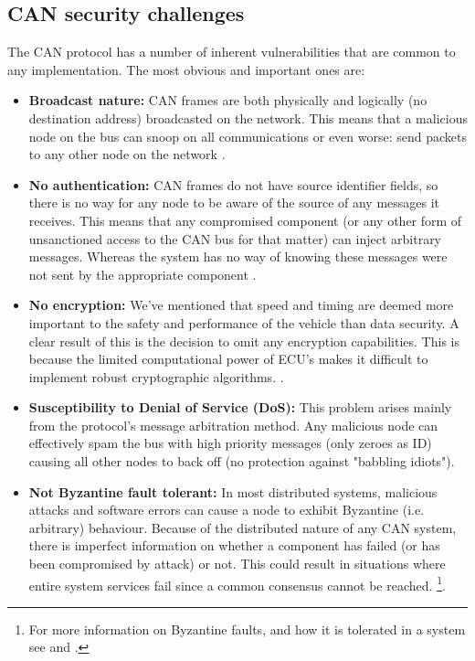 \documentclass[master=cws,masteroption=vs,english]{kulemt}
\begin{document}
\subsection{CAN security challenges}
\label{sec:can_challenges}
The CAN protocol has a number of inherent vulnerabilities that are common to any implementation. The most obvious and important ones are:

\begin{itemize}
	\item \textbf{Broadcast nature:} CAN frames are both physically and logically (no destination address) broadcasted on the network. This means that a malicious node on the bus can snoop on all communications or even worse: send packets to any other node on the network \cite{Kosher}. 
	
	\item \textbf{No authentication:} CAN frames do not have source identifier fields, so there is no way for any node to be aware of the source of any messages it receives. This means that any compromised component (or any other form of unsanctioned access to the CAN bus for that matter) can inject arbitrary messages. Whereas the system has no way of knowing these messages were not sent by the appropriate component \cite{Kosher}\cite{CANissues}.
	
	\item \textbf{No encryption:} We've mentioned that speed and timing are deemed more important to the safety and performance of the vehicle than data security. A clear result of this is the decision to omit any encryption capabilities. This is because the limited  computational power of ECU's makes it difficult to implement robust cryptographic algorithms. \cite{CANissues}.  
	
	\item \textbf{Susceptibility to Denial of Service (DoS):} This problem arises mainly from the protocol's message arbitration method. Any malicious node can effectively spam the bus with high priority messages (only zeroes as ID) causing all other nodes to back off (no protection against "babbling idiots"\cite{Pike15})\cite{Kosher}.
	
	\item \textbf{Not Byzantine fault tolerant:} In most distributed systems, malicious attacks and software errors can cause a node to exhibit Byzantine (i.e. arbitrary) behaviour\cite{Byzantine}. Because of the distributed nature of any CAN system, there is imperfect information on whether a component has failed (or has been compromised by attack) or not. This could result in situations where entire system services fail since a common consensus cannot be reached\cite{wiki:ByzantineFault}. \footnote{For more information on Byzantine faults, and how it is tolerated in a system see \cite{Byzantine} and \cite{wiki:ByzantineFault}.}.
	
\end{itemize}
\end{document}

